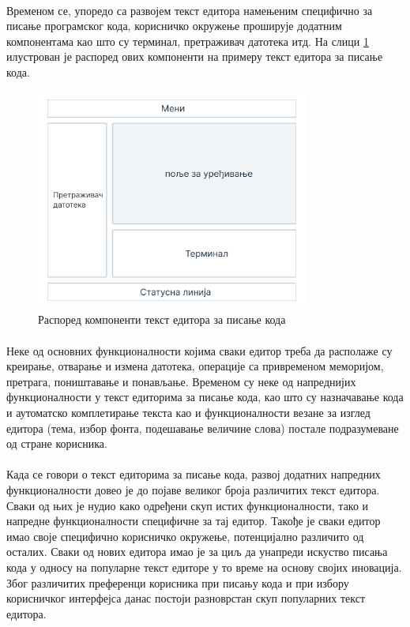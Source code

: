 \documentclass[12pt,oneside]{memoir}
\begin{document}
\paragraph{}
Временом се, упоредо са развојем текст едитора намењеним специфично за писање
програмског кода, корисничко окружење проширује додатним компонентама као што су терминал, претраживач датотека итд. На слици \ref{fig:layout} илустрован је распоред ових
компоненти на примеру текст едитора за писање кода.

\begin{figure}[!ht]
	\centering
	\includegraphics[width=0.8\textwidth]{images/raspored.png}
	\caption{Распоред компоненти текст едитора за писање кода}
	\label{fig:layout}
\end{figure}

\paragraph{}
Неке од основних функционалности којима сваки едитор треба да располаже су креирање, отварање
и измена датотека, операције са привременом меморијом, претрага, поништавање и 
понављање. Временом су неке од напреднијих функционалности у текст едиторима
за писање кода, као што су назначавање кода и аутоматско комплетирање текста као и
функционалности везане за изглед едитора (тема, избор фонта, подешавање величине слова)
постале подразумеване од стране корисника.

\paragraph{}
Када се говори о текст едиторима за писање кода, развој додатних напредних функционалности
довео је до појаве великог броја различитих текст едитора. Сваки од њих је нудио како
одређени скуп истих функционалности, тако и напредне функционалности специфичне за тај
едитор. Такође је сваки едитор имао своје специфично корисничко окружење, потенцијално различито од осталих. Сваки од нових едитора имао је за циљ да унапреди искуство писања кода у односу на популарне
текст едиторе у то време на основу својих иновација. Због различитих преференци корисника
при писању кода и при избору корисничког интерфејса данас постоји разноврстан скуп
популарних текст едитора.
\end{document}
